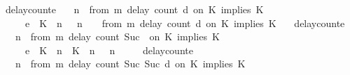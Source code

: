 \begin{isabellebody}
{\isacharbar}\ delay{\isacharunderscore}count{\isacharunderscore}e{}{\isacharcolon}\isanewline
%
\isanewline
\ \ {\isacartoucheopen}{\isacharparenleft}{\isasymGamma}{\isacharcomma}\ n\ {\isasymturnstile}\ {\isacharparenleft}{\isacharparenleft}from\ m\ delay\ count\ d\ on\ K\ implies\ K\ {\isacharhash}\ {\isasymPsi}{\isacharparenright}\ {\isasymtriangleright}\ {\isasymPhi}{\isacharparenright}\isanewline
\ \ \ \ \ {\isasymhookrightarrow}\isactrlsub e\ \ {\isacharparenleft}{\isacharparenleft}{\isacharparenleft}K\ {\isasymnot}{\isasymUp}\ n{\isacharparenright}\ {\isacharhash}\ {\isasymGamma}{\isacharparenright}{\isacharcomma}\ n\ {\isasymturnstile}\ {\isasymPsi}\ {\isasymtriangleright}\ {\isacharparenleft}{\isacharparenleft}from\ m\ delay\ count\ d\ on\ K\ implies\ K\ {\isacharhash}\ {\isasymPhi}{\isacharparenright}{\isacharparenright}{\isacartoucheclose}\isanewline
{\isacharbar}\ delay{\isacharunderscore}count{\isacharunderscore}e{}{\isacharcolon}\isanewline
%
\isanewline
\ \ {\isacartoucheopen}{\isacharparenleft}{\isasymGamma}{\isacharcomma}\ n\ {\isasymturnstile}\ {\isacharparenleft}{\isacharparenleft}from\ m\ delay\ count\ {\isacharparenleft}Suc\ {}{\isacharparenright}\ on\ K\ implies\ K\ {\isacharhash}\ {\isasymPsi}{\isacharparenright}\ {\isasymtriangleright}\ {\isasymPhi}{\isacharparenright}\isanewline
\ \ \ \ \ {\isasymhookrightarrow}\isactrlsub e\ \ {\isacharparenleft}{\isacharparenleft}{\isacharparenleft}K\ {\isasymUp}\ n{\isacharparenright}\ {\isacharhash}\ {\isacharparenleft}K\ {\isasymUp}\ n{\isacharparenright}\ {\isacharhash}\ {\isasymGamma}{\isacharparenright}{\isacharcomma}\ n\ {\isasymturnstile}\ {\isasymPsi}\ {\isasymtriangleright}\ {\isasymPhi}{\isacharparenright}{\isacartoucheclose}\isanewline
{\isacharbar}\ delay{\isacharunderscore}count{\isacharunderscore}e{}{\isacharcolon}\isanewline
%
\isanewline
\ \ {\isacartoucheopen}{\isacharparenleft}{\isasymGamma}{\isacharcomma}\ n\ {\isasymturnstile}\ {\isacharparenleft}{\isacharparenleft}from\ m\ delay\ count\ {\isacharparenleft}Suc\ {\isacharparenleft}Suc\ d{\isacharparenright}{\isacharparenright}\ on\ K\ implies\ K\ {\isacharhash}\ {\isasymPsi}{\isacharparenright}\ {\isasymtriangleright}\ {\isasymPhi}{\isacharparenright}\isanewline

\end{isabellebody}
